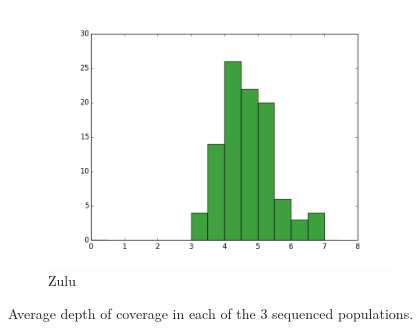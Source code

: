 \begin{figure}[htp]
\begin{subfigure}{.3\textwidth}
  \includegraphics[width=1.0\linewidth]{fig/coverage_zulu.png}
  \caption{Zulu}
\end{subfigure}
\caption{Average depth of coverage in each of the 3 sequenced populations.}
\label{fig:coverage}
\end{figure}